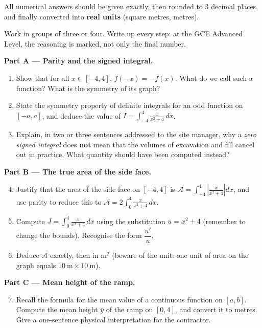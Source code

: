 \documentclass[11pt]{article}
\newcounter{popsec}
\newcounter{popsub}
\newcommand{\courssub}[1]{%
  \stepcounter{popsub}%
  \par\vspace{9pt}\noindent{\popxbold\fontsize{11.5}{13}\selectfont\color{popink}{\color{poporange}\thepopsec.\thepopsub}\hspace{6pt}#1}\par\nopagebreak\vspace{4pt}
}
\begin{document}
All numerical answers should be given exactly, then rounded to $3$ decimal places, and finally converted into \textbf{real units} (square metres, metres).

\courssub{Tasks}

Work in groups of three or four. Write up every step: at the GCE Advanced Level, the reasoning is marked, not only the final number.

\textbf{Part A — Parity and the signed integral.}

\begin{enumerate}
\item Show that for all $x\in[-4,4]$, $f(-x) = -f(x)$. What do we call such a function? What is the symmetry of its graph?
\item State the symmetry property of definite integrals for an odd function on $[-a,a]$, and deduce the value of $\displaystyle I = \int_{-4}^{4}\frac{x}{x^2+4}\,dx$.
\item Explain, in two or three sentences addressed to the site manager, why a \emph{zero signed integral} does \textbf{not} mean that the volumes of excavation and fill cancel out in practice. What quantity should have been computed instead?
\end{enumerate}

\textbf{Part B — The true area of the side face.}

\begin{enumerate}
\setcounter{enumi}{3}
\item Justify that the area of the side face on $[-4,4]$ is $\mathcal{A} = \displaystyle\int_{-4}^{4} \left|\frac{x}{x^2+4}\right| dx$, and use parity to reduce this to $\mathcal{A} = 2\displaystyle\int_{0}^{4}\frac{x}{x^2+4}\,dx$.
\item Compute $J = \displaystyle\int_{0}^{4}\frac{x}{x^2+4}\,dx$ using the substitution $u = x^2+4$ (remember to change the bounds). Recognise the form $\dfrac{u'}{u}$.
\item Deduce $\mathcal{A}$ exactly, then in $\mathrm{m}^2$ (beware of the unit: one unit of area on the graph equals $10\ \mathrm{m}\times 10\ \mathrm{m}$).
\end{enumerate}

\textbf{Part C — Mean height of the ramp.}

\begin{enumerate}
\setcounter{enumi}{6}
\item Recall the formula for the mean value of a continuous function on $[a,b]$. Compute the mean height $\bar{y}$ of the ramp on $[0,4]$, and convert it to metres. Give a one-sentence physical interpretation for the contractor.
\end{enumerate}
\end{document}
